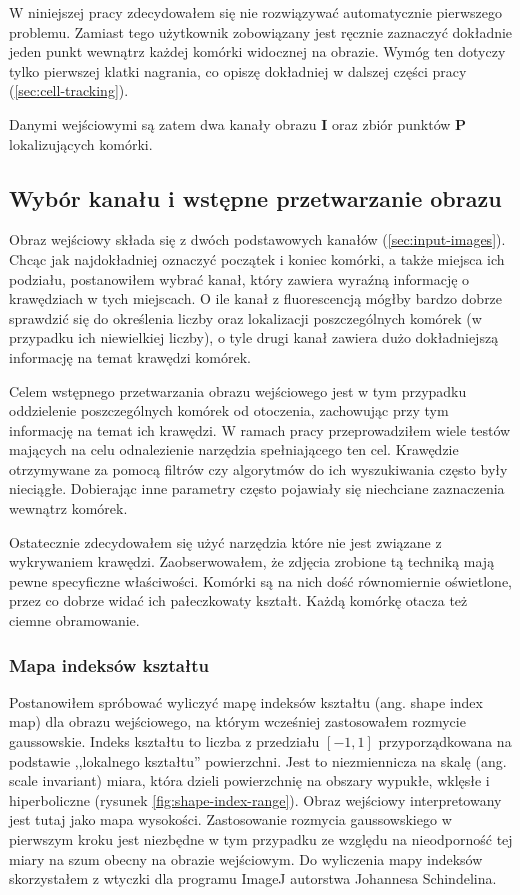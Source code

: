 \documentclass[declaration,shortabstract,mgr]{iithesis}
\newcommand{\image}{\mathbf{I}}
\begin{document}
W niniejszej pracy zdecydowałem się nie rozwiązywać automatycznie pierwszego problemu.
Zamiast tego użytkownik zobowiązany jest ręcznie zaznaczyć dokładnie jeden punkt wewnątrz każdej komórki widocznej na obrazie.
Wymóg ten dotyczy tylko pierwszej klatki nagrania, co opiszę dokładniej w dalszej części pracy (\ref{sec:cell-tracking}).

Danymi wejściowymi są zatem dwa kanały obrazu $\image$ oraz zbiór punktów $\mathbf{P}$ lokalizujących komórki.

\subsection{Wybór kanału i wstępne przetwarzanie obrazu}

Obraz wejściowy składa się z dwóch podstawowych kanałów (\ref{sec:input-images}).
Chcąc jak najdokładniej oznaczyć początek i koniec komórki, a także miejsca ich podziału, postanowiłem wybrać kanał, który zawiera wyraźną informację o krawędziach w tych miejscach.
O ile kanał z fluorescencją mógłby bardzo dobrze sprawdzić się do określenia liczby oraz lokalizacji poszczególnych komórek (w przypadku ich niewielkiej liczby), o tyle drugi kanał zawiera dużo dokładniejszą informację na temat krawędzi komórek.

Celem wstępnego przetwarzania obrazu wejściowego jest w tym przypadku oddzielenie poszczególnych komórek od otoczenia, zachowując przy tym informację na temat ich krawędzi. W ramach pracy przeprowadziłem wiele testów mających na celu odnalezienie narzędzia spełniającego ten cel. Krawędzie otrzymywane za pomocą filtrów czy algorytmów do ich wyszukiwania często były nieciągłe. Dobierając inne parametry często pojawiały się niechciane zaznaczenia wewnątrz komórek.

Ostatecznie zdecydowałem się użyć narzędzia które nie jest związane z wykrywaniem krawędzi. Zaobserwowałem, że zdjęcia zrobione tą techniką mają pewne specyficzne właściwości. Komórki są na nich dość równomiernie oświetlone, przez co dobrze widać ich pałeczkowaty kształt. Każdą komórkę otacza też ciemne obramowanie.

\subsubsection{Mapa indeksów kształtu}

Postanowiłem spróbować wyliczyć mapę indeksów kształtu\cite{paper:shape-index} (ang. shape index map) dla obrazu wejściowego, na którym wcześniej zastosowałem rozmycie gaussowskie. Indeks kształtu to liczba z przedziału $[-1, 1]$ przyporządkowana na podstawie ,,lokalnego kształtu'' powierzchni. Jest to niezmiennicza na skalę (ang. scale invariant) miara, która dzieli powierzchnię na obszary wypukłe, wklęsłe i hiperboliczne (rysunek \ref{fig:shape-index-range}). Obraz wejściowy interpretowany jest tutaj jako mapa wysokości. Zastosowanie rozmycia gaussowskiego w pierwszym kroku jest niezbędne w tym przypadku ze względu na nieodporność tej miary na szum obecny na obrazie wejściowym. Do wyliczenia mapy indeksów skorzystałem z wtyczki dla programu ImageJ autorstwa Johannesa Schindelina\cite{plugin:shape-index-map}.
\end{document}
